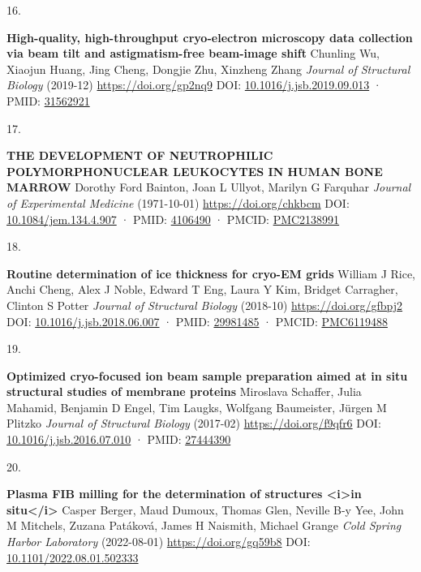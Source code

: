 \documentclass[
]{article}
\newlength{\cslhangindent}
\newlength{\csllabelwidth}
\newlength{\cslentryspacingunit} %
\newenvironment{CSLReferences}[2] %
 {%
  \setlength{\parindent}{0pt}
  \ifodd #1
  \let\oldpar\par
  \def\par{\hangindent=\cslhangindent\oldpar}
  \fi
  \setlength{\parskip}{#2\cslentryspacingunit}
 }%
 {}
\newcommand{\CSLBlock}[1]{#1\hfill\break}
\newcommand{\CSLLeftMargin}[1]{\parbox[t]{\csllabelwidth}{#1}}
\newcommand{\CSLRightInline}[1]{\parbox[t]{\linewidth - \csllabelwidth}{#1}\break}
\begin{document}
\begin{CSLReferences}{0}{0}
\leavevmode{}%
\CSLLeftMargin{16. }%
\CSLRightInline{\textbf{High-quality, high-throughput cryo-electron microscopy data collection via beam tilt and astigmatism-free beam-image shift}
\CSLBlock{Chunling Wu, Xiaojun Huang, Jing Cheng, Dongjie Zhu, Xinzheng Zhang} \emph{Journal of Structural Biology} (2019-12) \url{https://doi.org/gp2nq9}
\CSLBlock{DOI: \href{https://doi.org/10.1016/j.jsb.2019.09.013}{10.1016/j.jsb.2019.09.013} · PMID: \href{https://www.ncbi.nlm.nih.gov/pubmed/31562921}{31562921}}}

\leavevmode{}%
\CSLLeftMargin{17. }%
\CSLRightInline{\textbf{THE DEVELOPMENT OF NEUTROPHILIC POLYMORPHONUCLEAR LEUKOCYTES IN HUMAN BONE MARROW}
\CSLBlock{Dorothy Ford Bainton, Joan L Ullyot, Marilyn G Farquhar} \emph{Journal of Experimental Medicine} (1971-10-01) \url{https://doi.org/chkbcm}
\CSLBlock{DOI: \href{https://doi.org/10.1084/jem.134.4.907}{10.1084/jem.134.4.907} · PMID: \href{https://www.ncbi.nlm.nih.gov/pubmed/4106490}{4106490} · PMCID: \href{https://www.ncbi.nlm.nih.gov/pmc/articles/PMC2138991}{PMC2138991}}}

\leavevmode{}%
\CSLLeftMargin{18. }%
\CSLRightInline{\textbf{Routine determination of ice thickness for cryo-EM grids}
\CSLBlock{William J Rice, Anchi Cheng, Alex J Noble, Edward T Eng, Laura Y Kim, Bridget Carragher, Clinton S Potter} \emph{Journal of Structural Biology} (2018-10) \url{https://doi.org/gfbpj2}
\CSLBlock{DOI: \href{https://doi.org/10.1016/j.jsb.2018.06.007}{10.1016/j.jsb.2018.06.007} · PMID: \href{https://www.ncbi.nlm.nih.gov/pubmed/29981485}{29981485} · PMCID: \href{https://www.ncbi.nlm.nih.gov/pmc/articles/PMC6119488}{PMC6119488}}}

\leavevmode{}%
\CSLLeftMargin{19. }%
\CSLRightInline{\textbf{Optimized cryo-focused ion beam sample preparation aimed at in situ structural studies of membrane proteins}
\CSLBlock{Miroslava Schaffer, Julia Mahamid, Benjamin D Engel, Tim Laugks, Wolfgang Baumeister, Jürgen M Plitzko} \emph{Journal of Structural Biology} (2017-02) \url{https://doi.org/f9qfr6}
\CSLBlock{DOI: \href{https://doi.org/10.1016/j.jsb.2016.07.010}{10.1016/j.jsb.2016.07.010} · PMID: \href{https://www.ncbi.nlm.nih.gov/pubmed/27444390}{27444390}}}

\leavevmode{}%
\CSLLeftMargin{20. }%
\CSLRightInline{\textbf{Plasma FIB milling for the determination of structures \textless i\textgreater in situ\textless/i\textgreater{}}
\CSLBlock{Casper Berger, Maud Dumoux, Thomas Glen, Neville B-y Yee, John M Mitchels, Zuzana Patáková, James H Naismith, Michael Grange} \emph{Cold Spring Harbor Laboratory} (2022-08-01) \url{https://doi.org/gq59b8}
\CSLBlock{DOI: \href{https://doi.org/10.1101/2022.08.01.502333}{10.1101/2022.08.01.502333}}}


\end{CSLReferences}
\end{document}
